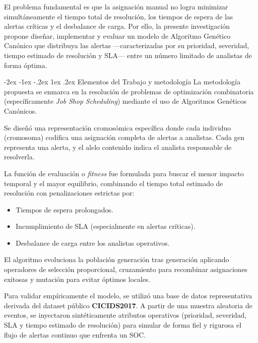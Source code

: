 \documentclass[12pt,a4paper,twocolumn]{article}
\makeatletter
\renewcommand{\section}{\@startsection{section}{1}{\z@}%
  {-2ex \@plus -1ex \@minus -.2ex}%
  {1ex \@plus.2ex}%
  {\fontsize{12}{14}\selectfont\bfseries}}
\makeatother
\begin{document}
El problema fundamental es que la asignación manual no logra minimizar simultáneamente el tiempo total de resolución, los tiempos de espera de las alertas críticas y el desbalance de carga. Por ello, la presente investigación propone diseñar, implementar y evaluar un modelo de Algoritmo Genético Canónico que distribuya las alertas ---caracterizadas por su prioridad, severidad, tiempo estimado de resolución y SLA--- entre un número limitado de analistas de forma óptima.

\section{Elementos del Trabajo y metodología}
La metodología propuesta se enmarca en la resolución de problemas de optimización combinatoria (específicamente \textit{Job Shop Scheduling}) mediante el uso de Algoritmos Genéticos Canónicos.

Se diseñó una representación cromosómica específica donde cada individuo (cromosoma) codifica una asignación completa de alertas a analistas. Cada gen representa una alerta, y el alelo contenido indica el analista responsable de resolverla.

La función de evaluación o \textit{fitness} fue formulada para buscar el menor impacto temporal y el mayor equilibrio, combinando el tiempo total estimado de resolución con penalizaciones estrictas por:
\begin{itemize}
    \item Tiempos de espera prolongados.
    \item Incumplimiento de SLA (especialmente en alertas críticas).
    \item Desbalance de carga entre los analistas operativos.
\end{itemize}

El algoritmo evoluciona la población generación tras generación aplicando operadores de selección proporcional, cruzamiento para recombinar asignaciones exitosas y mutación para evitar óptimos locales.

Para validar empíricamente el modelo, se utilizó una base de datos representativa derivada del dataset público \textbf{CICIDS2017}. A partir de una muestra aleatoria de eventos, se inyectaron sintéticamente atributos operativos (prioridad, severidad, SLA y tiempo estimado de resolución) para simular de forma fiel y rigurosa el flujo de alertas continuo que enfrenta un SOC.
\end{document}
